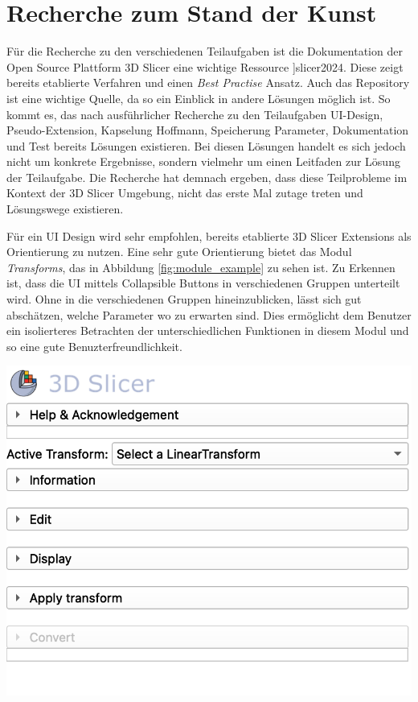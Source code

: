 \section{Recherche zum Stand der Kunst}
\label{sec:recherche} Für die Recherche zu den verschiedenen Teilaufgaben ist
die Dokumentation der Open Source Plattform 3D Slicer eine wichtige Ressource
\cite[vgl.]{[}]{slicer2024}. Diese zeigt bereits etablierte Verfahren und einen \textit{Best
Practise} Ansatz. Auch das \citet{extensionsIndex2024} Repository ist eine
wichtige Quelle, da so ein Einblick in andere Lösungen möglich ist. So kommt es,
das nach ausführlicher Recherche zu den Teilaufgaben UI-Design, Pseudo-Extension,
Kapselung Hoffmann, Speicherung Parameter, Dokumentation und Test bereits Lösungen
existieren. Bei diesen Lösungen handelt es sich jedoch nicht um konkrete
Ergebnisse, sondern vielmehr um einen Leitfaden zur Lösung der Teilaufgabe. Die
Recherche hat demnach ergeben, dass diese Teilprobleme im Kontext der 3D Slicer Umgebung,
nicht das erste Mal zutage treten und Lösungswege existieren.

\begin{minipage}{0.40\textwidth}
	Für ein UI Design wird sehr empfohlen, bereits etablierte 3D Slicer Extensions
	als Orientierung zu nutzen. Eine sehr gute Orientierung bietet das Modul \textit{Transforms},
	das in Abbildung \ref{fig:module_example} zu sehen ist. Zu Erkennen ist, dass die
	UI mittels Collapsible Buttons in verschiedenen Gruppen unterteilt wird. Ohne
	in die verschiedenen Gruppen hineinzublicken, lässt sich gut abschätzen,
	welche Parameter wo zu erwarten sind. Dies ermöglicht dem Benutzer ein isolierteres
	Betrachten der unterschiedlichen Funktionen in diesem Modul und so eine gute Benuzterfreundlichkeit.
\end{minipage}
\hfill
\begin{minipage}{0.50\textwidth}
	\centering
	\includegraphics[scale=0.50]{img/modul_example.jpg}
	\label{fig:module_example}
\end{minipage}


